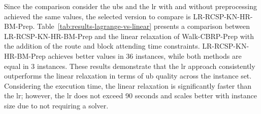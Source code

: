 Since the comparison consider the \gls{ub}s and the \gls{lr} with and without preprocessing achieved the same values, the selected version to compare is LR-RCSP-KN-HR-BM-Prep. Table~\ref{tab:results-lagrange-vs-linear} presents a comparison between LR-RCSP-KN-HR-BM-Prep and the linear relaxation of Walk-CBRP-Prep with the addition of the route and block attending time constraints.
LR-RCSP-KN-HR-BM-Prep achieves better values in 36 instances, while both methods are equal in 3 instances.
These results demonstrate that the \gls{lr} approach consistently outperforms the linear relaxation in terms of \gls{ub} quality across the instance set.
Considering the execution time, the linear relaxation is significantly faster than the \gls{lr}; however, the \gls{lr} does not exceed 90 seconds and scales better with instance size due to not requiring a solver.

